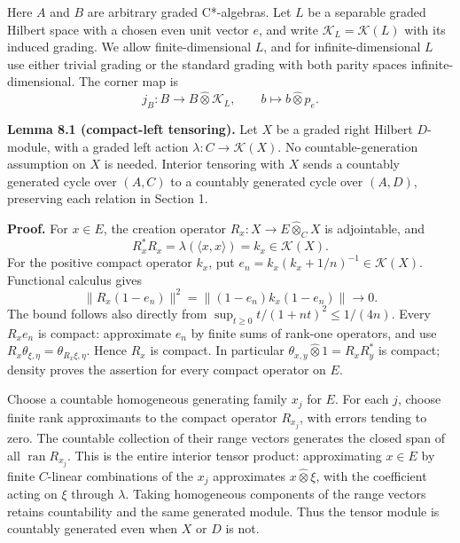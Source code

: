 \documentclass[
  11pt,
]{article}
\begin{document}
Here \(A\) and \(B\) are arbitrary graded C*-algebras. Let \(L\) be a
separable graded Hilbert space with a chosen even unit vector \(e\), and
write \(\mathcal K_L=\mathcal K(L)\) with its induced grading. We allow
finite-dimensional \(L\), and for infinite-dimensional \(L\) use either
trivial grading or the standard grading with both parity spaces
infinite-dimensional. The corner map is \[
j_B:B\longrightarrow B\widehat\otimes\mathcal K_L,
\qquad b\longmapsto b\widehat\otimes p_e.
\tag{8.1}
\]

\textbf{Lemma 8.1 (compact-left tensoring).} Let \(X\) be a graded right
Hilbert \(D\)-module, with a graded left action
\(\lambda:C\to\mathcal K(X)\). No countable-generation assumption on
\(X\) is needed. Interior tensoring with \(X\) sends a countably
generated cycle over \((A,C)\) to a countably generated cycle over
\((A,D)\), preserving each relation in Section 1.

\textbf{Proof.} For \(x\in E\), the creation operator
\(R_x:X\to E\widehat\otimes_C X\) is adjointable, and \[
R_x^*R_x=\lambda(\langle x,x\rangle)=k_x\in\mathcal K(X).
\tag{8.1a}
\] For the positive compact operator \(k_x\), put
\(e_n=k_x(k_x+1/n)^{-1}\in\mathcal K(X)\). Functional calculus gives \[
\|R_x(1-e_n)\|^2
=\|(1-e_n)k_x(1-e_n)\|\longrightarrow0.
\tag{8.1b}
\] The bound follows also directly from
\(\sup_{t\geq0}t/(1+nt)^2\leq1/(4n)\). Every \(R_xe_n\) is compact:
approximate \(e_n\) by finite sums of rank-one operators, and use
\(R_x\theta_{\xi,\eta}=\theta_{R_x\xi,\eta}\). Hence \(R_x\) is compact.
In particular \(\theta_{x,y}\widehat\otimes1=R_xR_y^*\) is compact;
density proves the assertion for every compact operator on \(E\).

Choose a countable homogeneous generating family \(x_j\) for \(E\). For
each \(j\), choose finite rank approximants to the compact operator
\(R_{x_j}\), with errors tending to zero. The countable collection of
their range vectors generates the closed span of all
\(\operatorname{ran}R_{x_j}\). This is the entire interior tensor
product: approximating \(x\in E\) by finite \(C\)-linear combinations of
the \(x_j\) approximates \(x\widehat\otimes\xi\), with the coefficient
acting on \(\xi\) through \(\lambda\). Taking homogeneous components of
the range vectors retains countability and the same generated module.
Thus the tensor module is countably generated even when \(X\) or \(D\)
is not.
\end{document}
